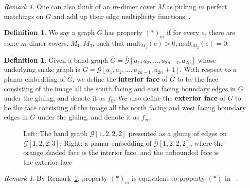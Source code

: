 \documentclass[11pt]{amsart}
\theoremstyle{definition}
\newtheorem{defn}[thm]{Definition}
\theoremstyle{remark}
\newtheorem{rem}[thm]{Remark}
\numberwithin{equation}{section}
\begin{document}
\begin{rem}\label{rem: alternative_view_of_m_covers}
One can also think of an $m$-dimer cover $M$ as picking $m$ perfect matchings on $G$ and add up their edge multiplicity functions~\cite{musiker2022double}.
\end{rem}

\begin{defn}
    We say a graph $G$ has property $(*)_m$ if for every $e$, there are some $m$-dimer covers, $M_1,M_2$, such that $\text{mult}_{M_1}(e) >0, \text{mult}_{M_2}(e) = 0$. 
\end{defn}

\begin{defn}
    Given a band graph $\overline{G}= \overline{\mathcal{G}}[a_1,a_2,...,a_{2n-1},a_{2n}]$ whose underlying snake graph is $G = \mathcal{G}[a_1,a_2,...,a_{2n-1},a_{2n}+1]$. With respect to a planar embedding of $\overline{G}$, we define the \textbf{interior face} of $\overline{G}$ to be the face consisting of the image all the south facing and east facing boundary edges in $G$ under the gluing, and denote it as $f_0$. We also define the \textbf{exterior face} of $\overline{G}$ to be the face consisting of the image all the north facing and west facing boundary edges in $G$ under the gluing, and denote it as $f_\infty$. 
\end{defn}

\begin{figure}[h!]
    \centering
    
    \caption{Left: The band graph $\overline{\mathcal{G}}[1,2,2,2]$ presented as a gluing of edges on $\mathcal{G}[1,2,2,3]$; Right: a planar embedding of $\overline{\mathcal{G}}[1,2,2,2]$, where the orange shaded face is the interior face, and the unbounded face is the exterior face}
    \label{fig:interior_exterior_faces}
    \end{figure}

\begin{rem}
    By Remark~\ref{rem: alternative_view_of_m_covers}, property $(*)_m$ is equivalent to property $(*)$ in ~\cite{dimer_knots}.
\end{rem}
\end{document}
